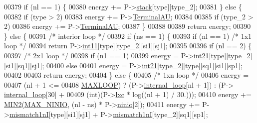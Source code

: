 \begin{DoxyCode}
00379     \textcolor{keywordflow}{if} (nl == 1) \{
00380       energy += P->\mbox{\hyperlink{group__energy__parameters_af7cdedcea1bb1c171856ab06dc9f6ed2}{stack}}[type][type\_2];
00381     \} \textcolor{keywordflow}{else} \{
00382       \textcolor{keywordflow}{if} (type > 2)
00383         energy += P->\mbox{\hyperlink{group__energy__parameters_a0ad35507a03ba7f751e82cb375e991dd}{TerminalAU}};
00384 
00385       \textcolor{keywordflow}{if} (type\_2 > 2)
00386         energy += P->\mbox{\hyperlink{group__energy__parameters_a0ad35507a03ba7f751e82cb375e991dd}{TerminalAU}};
00387     \}
00388 
00389     \textcolor{keywordflow}{return} energy;
00390   \} \textcolor{keywordflow}{else} \{
00391     \textcolor{comment}{/* interior loop */}
00392     \textcolor{keywordflow}{if} (ns == 1) \{
00393       \textcolor{keywordflow}{if} (nl == 1)                    \textcolor{comment}{/* 1x1 loop */}
00394         \textcolor{keywordflow}{return} P->\mbox{\hyperlink{group__energy__parameters_a585e235827774a0073be22bf00e48c30}{int11}}[type][type\_2][si1][sj1];
00395 
00396       \textcolor{keywordflow}{if} (nl == 2) \{
00397         \textcolor{comment}{/* 2x1 loop */}
00398         \textcolor{keywordflow}{if} (n1 == 1)
00399           energy = P->\mbox{\hyperlink{group__energy__parameters_a983245e30d7a41a3102e5e5ea4bec7e2}{int21}}[type][type\_2][si1][sq1][sj1];
00400         \textcolor{keywordflow}{else}
00401           energy = P->\mbox{\hyperlink{group__energy__parameters_a983245e30d7a41a3102e5e5ea4bec7e2}{int21}}[type\_2][type][sq1][si1][sp1];
00402 
00403         \textcolor{keywordflow}{return} energy;
00404       \} \textcolor{keywordflow}{else} \{
00405         \textcolor{comment}{/* 1xn loop */}
00406         energy =
00407           (nl + 1 <=
00408            \mbox{\hyperlink{energy__const_8h_ad1bd6eabac419670ddd3c9ed82145988}{MAXLOOP}}) ? (P->\mbox{\hyperlink{group__energy__parameters_a2a4fb2c65023ec371c9b96573da6d2fc}{internal\_loop}}[nl + 1]) : (P->
      \mbox{\hyperlink{group__energy__parameters_a2a4fb2c65023ec371c9b96573da6d2fc}{internal\_loop}}[30] +
00409                                                     (int)(P->\mbox{\hyperlink{group__energy__parameters_a24ea058414d3fb918c7fbf189a4a1e51}{lxc}} * log((nl + 1) / 30.)));
00410         energy  += \mbox{\hyperlink{group__utils_gae0b9cd0ce090bd69b951aa73e8fa4f7d}{MIN2}}(\mbox{\hyperlink{energy__par_8h_a700828dfe2f8687d005949773c9c7e7c}{MAX\_NINIO}}, (nl - ns) * P->\mbox{\hyperlink{group__energy__parameters_ac03c4835310b225a64ea9eb77a174940}{ninio}}[2]);
00411         energy  += P->\mbox{\hyperlink{group__energy__parameters_a6058cd6334a2e5929bd36315e9d0fe3a}{mismatch1nI}}[type][si1][sj1] + P->\mbox{\hyperlink{group__energy__parameters_a6058cd6334a2e5929bd36315e9d0fe3a}{mismatch1nI}}[type\_2][sq1][sp1];

\end{DoxyCode}
